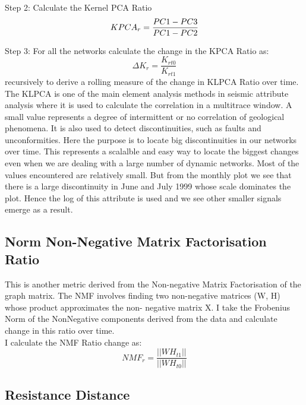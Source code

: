 Step 2: Calculate the Kernel PCA Ratio
\begin{equation}
      KPCA_{r} = \frac{PC1-PC3}{PC1-PC2} \\
\end{equation}


Step 3: For all the networks calculate the change in the KPCA Ratio as:
\begin{equation}
      \Delta K_{r} =\frac{K_{rt0}}{K_{rt1}} 
\end{equation}
recursively to derive a rolling measure of the change in KLPCA Ratio over time.\\

The KLPCA is one of the main element analysis methods in seismic attribute analysis where it is used to calculate the  correlation in a multitrace window. A small value represents a degree of intermittent or no correlation of geological phenomena. It is also used to detect discontinuities, such as faults and unconformities. Here the purpose is to locate big discontinuities in our networks over time. This represents a scalalble and easy way to locate the biggest changes even when we are dealing with a large number of dynamic networks. Most of the values encountered are relatively small. But from the monthly plot we see that there is a large discontinuity in June and July 1999 whose scale dominates the plot. Hence the log of this attribute is used and we see other smaller signals emerge as a result. 

\subsection{Norm Non-Negative Matrix Factorisation Ratio}

This is another metric derived from the Non-negative Matrix Factorisation of the graph matrix. The NMF involves finding two non-negative matrices (W, H) whose product approximates the non- negative matrix X. I take the Frobenius Norm of the NonNegative components derived from the data and calculate change in this ratio over time.\\

I calculate the NMF Ratio change as:
 \begin{equation}
     NMF_r = \frac{|| WH_{t1} ||}{|| WH_{t0} ||}
 \end{equation}
 
 
\subsection{Resistance Distance}

